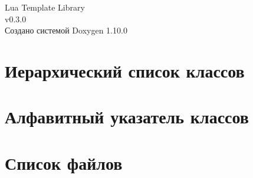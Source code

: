 \documentclass[twoside]{book}
\newcommand{\+}{\discretionary{\mbox{\scriptsize$\hookleftarrow$}}{}{}}
\newcommand{\clearemptydoublepage}{%
    \newpage{\pagestyle{empty}\cleardoublepage}%
  }
\begin{document}
  \raggedbottom
    \hypersetup{pageanchor=false,
                bookmarksnumbered=true,
                pdfencoding=unicode
               }
  \begin{titlepage}
  \vspace*{7cm}
  \begin{center}%
  {\Large Lua Template Library}\\
  [1ex]\large v0.\+3.\+0 \\
  \vspace*{1cm}
  {\large Создано системой Doxygen 1.10.0}\\
  \end{center}
  \end{titlepage}
  \clearemptydoublepage
  \tableofcontents
  \clearemptydoublepage
  \hypersetup{pageanchor=true}

\chapter{Иерархический список классов}

\chapter{Алфавитный указатель классов}

\chapter{Список файлов}

\end{document}
